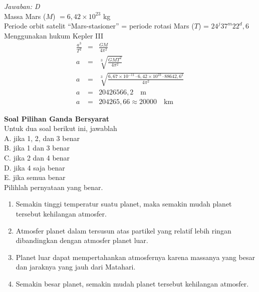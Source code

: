 \documentclass[11pt,fleqn, a4paper]{exam}
\begin{document}
\begin{questions}
\textit{Jawaban: D}\\
Massa Mars ($M$) $= 6,42 \times 10^{23}$ kg\\
Periode orbit satelit ``Mars-stasioner'' = periode rotasi Mars ($T$) = $24^j 37^m 22^{d},6$\\
Menggunakan hukum Kepler III
\begin{eqnarray*}
\frac{a^3}{T^2} &=& \frac{GM}{4 \pi^{2}} \\
a &=& \sqrt[3]{\frac{GMT^2}{4 \pi^{2}}} \\
a &=& \sqrt[3]{\frac{6,67 \times 10^{-11} \cdot 6,42 \times 10^{23} \cdot 88642,6^2}{4 \pi^{2}}}\\
a &=& 20426566,2 \quad \text{m} \\
a &=& 204265,66 \approx 20000 \quad \text{km} 
\end{eqnarray*}


\vspace{1cm}
\textbf{Soal Pilihan Ganda Bersyarat}\\
Untuk dua soal berikut ini, jawablah\\
A. jika 1, 2, dan 3 benar\\
B. jika 1 dan 3 benar\\
C. jika 2 dan 4 benar\\
D. jika 4 saja benar\\
E. jika semua benar\\

\question Pilihlah pernyataan yang benar.
\begin{enumerate}
\item Semakin tinggi temperatur suatu planet, maka semakin mudah planet tersebut kehilangan atmosfer.
\item Atmosfer planet dalam tersusun atas partikel yang relatif lebih ringan dibandingkan dengan atmosfer planet luar.
\item Planet luar dapat mempertahankan atmosfernya karena massanya yang besar dan jaraknya yang jauh dari Matahari.
\item Semakin besar planet, semakin mudah planet tersebut kehilangan atmosfer.
\end{enumerate}


\end{questions}
\end{document}
